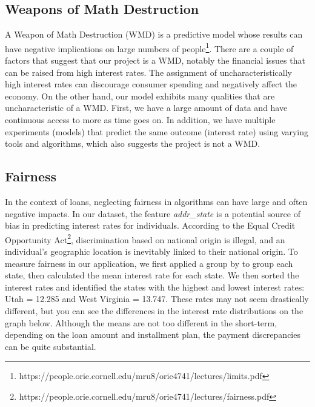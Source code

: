 \documentclass[twocolumn]{article}
\begin{document}
\subsection{Weapons of Math Destruction}
\par{\hspace{18}A Weapon of Math Destruction (WMD) is a predictive model whose results can have negative implications on large numbers of people\footnote{https://people.orie.cornell.edu/mru8/orie4741/lectures/limits.pdf}. There are a couple of factors that suggest that our project is a WMD, notably the financial issues that can be raised from high interest rates. The assignment of uncharacteristically high interest rates can discourage consumer spending and negatively affect the economy. On the other hand, our model exhibits many qualities that are uncharacteristic of a WMD. First, we have a large amount of data and have continuous access to more as time goes on. In addition, we have multiple experiments (models) that predict the same outcome (interest rate) using varying tools and algorithms, which also suggests the project is not a WMD. 
}

\subsection{Fairness}
\par{\hspace{18}In the context of loans, neglecting fairness in algorithms can have large and often negative impacts. In our dataset, the feature \textit{addr\_state} is a potential source of bias in predicting interest rates for individuals. According to the Equal Credit Opportunity Act\footnote{https://people.orie.cornell.edu/mru8/orie4741/lectures/fairness.pdf}, discrimination based on national origin is illegal, and an individual’s geographic location is inevitably linked to their national origin. To measure fairness in our application, we first applied a group by to group each state, then calculated the mean interest rate for each state. We then sorted the interest rates and identified the states with the highest and lowest interest rates: Utah = 12.285 and West Virginia = 13.747.  These rates may not seem drastically different, but you can see the differences in the interest rate distributions on the graph below.  Although the means are not too different in the short-term, depending on the loan amount and installment plan, the payment discrepancies can be quite substantial.}
\end{document}
